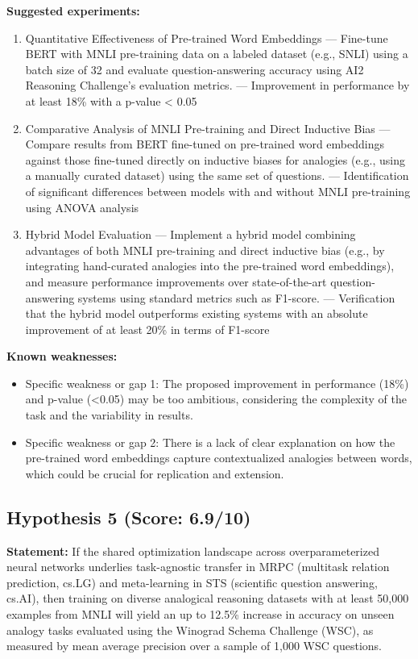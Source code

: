 \documentclass[12pt,a4paper]{article}
\begin{document}
\textbf{Suggested experiments:}
\begin{enumerate}
  \item Quantitative Effectiveness of Pre-trained Word Embeddings — Fine-tune BERT with MNLI pre-training data on a labeled dataset (e.g., SNLI) using a batch size of 32 and evaluate question-answering accuracy using AI2 Reasoning Challenge's evaluation metrics. — Improvement in performance by at least 18\% with a p-value < 0.05
  \item Comparative Analysis of MNLI Pre-training and Direct Inductive Bias — Compare results from BERT fine-tuned on pre-trained word embeddings against those fine-tuned directly on inductive biases for analogies (e.g., using a manually curated dataset) using the same set of questions. — Identification of significant differences between models with and without MNLI pre-training using ANOVA analysis
  \item Hybrid Model Evaluation — Implement a hybrid model combining advantages of both MNLI pre-training and direct inductive bias (e.g., by integrating hand-curated analogies into the pre-trained word embeddings), and measure performance improvements over state-of-the-art question-answering systems using standard metrics such as F1-score. — Verification that the hybrid model outperforms existing systems with an absolute improvement of at least 20\% in terms of F1-score
\end{enumerate}

\textbf{Known weaknesses:}
\begin{itemize}
  \item Specific weakness or gap 1: The proposed improvement in performance (18\%) and p-value (<0.05) may be too ambitious, considering the complexity of the task and the variability in results.
  \item Specific weakness or gap 2: There is a lack of clear explanation on how the pre-trained word embeddings capture contextualized analogies between words, which could be crucial for replication and extension.
\end{itemize}
\subsection*{Hypothesis 5 (Score: 6.9/10)}

\textbf{Statement:} If the shared optimization landscape across overparameterized neural networks underlies task-agnostic transfer in MRPC (multitask relation prediction, cs.LG) and meta-learning in STS (scientific question answering, cs.AI), then training on diverse analogical reasoning datasets with at least 50,000 examples from MNLI will yield an up to 12.5\% increase in accuracy on unseen analogy tasks evaluated using the Winograd Schema Challenge (WSC), as measured by mean average precision over a sample of 1,000 WSC questions.
\end{document}
